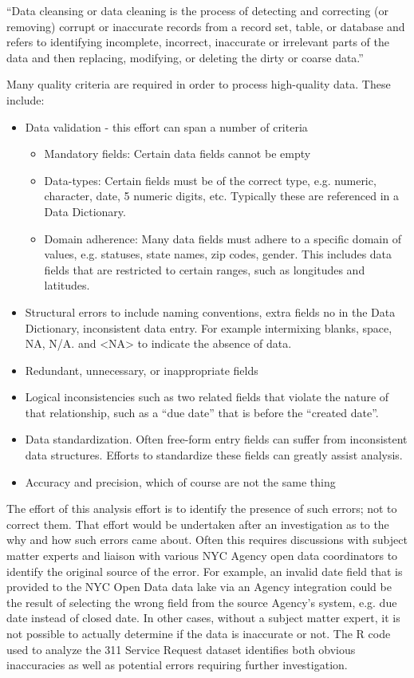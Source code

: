 \documentclass[12pt, titlepage]{article}
\begin{document}
``Data cleansing or data cleaning is the process of detecting and correcting (or removing) corrupt or inaccurate records from a record set, 
table, or database and refers to identifying incomplete, incorrect, inaccurate or irrelevant parts of the data 
and then replacing, modifying, or deleting the dirty or coarse data.''

Many quality criteria are required in order to process high-quality data. These include:

\begin{itemize}
	\item Data validation - this effort can span a number of criteria
	\begin{itemize}
		\item Mandatory fields: Certain data fields cannot be empty
		\item Data-types: Certain fields must be of the correct type, e.g. numeric, character, date, 5 numeric digits, etc. Typically these are referenced in a Data Dictionary.
		\item Domain adherence:  Many data fields must adhere to a specific domain of values, e.g. statuses, state names, zip codes, gender. This includes data
		fields that are restricted to certain ranges, such as longitudes and latitudes.
	\end{itemize}   
	\item Structural errors to include naming conventions, extra fields no in the Data Dictionary, inconsistent data entry.
	For example intermixing blanks, space, NA, N/A. and <NA> to indicate the absence of data.
	\item Redundant, unnecessary, or inappropriate fields
	\item Logical inconsistencies such as two related fields that violate the nature of that relationship, such as a ``due date'' that is before the ``created date''.
	\item Data standardization. Often free-form entry fields can suffer from inconsistent data structures. Efforts to standardize these fields can greatly assist analysis.
	\item Accuracy and precision, which of course are not the same thing 
\end{itemize}

The effort of this analysis effort is to identify the presence of such errors; not to correct them. That effort would be undertaken after an investigation as to the why
and how such errors came about. Often this requires discussions with subject matter experts and liaison with various NYC Agency open data coordinators
to identify the original source of the error. For example, an invalid date field that is provided to the NYC Open Data data lake via an Agency integration could
be the result of selecting the wrong field from the source Agency's system, e.g. due date instead of closed date. In other cases, without a subject matter
expert, it is not possible to actually determine if the data is inaccurate or not. The R code used to analyze the 311 Service Request dataset identifies
both obvious inaccuracies as well as potential errors requiring further investigation.
\end{document}

